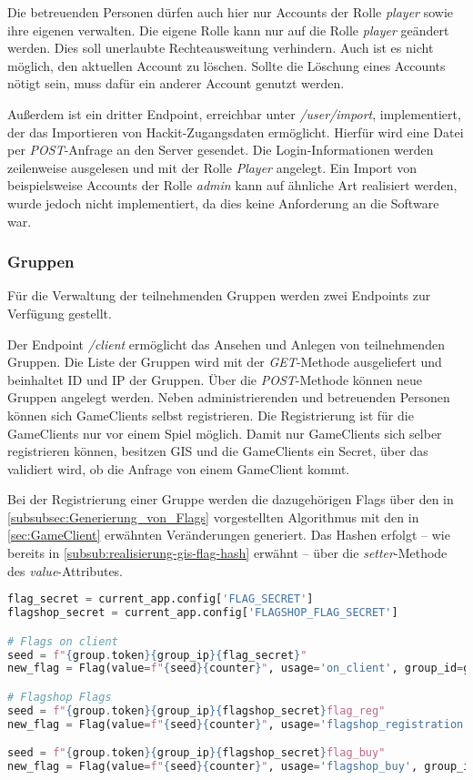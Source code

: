 Die betreuenden Personen dürfen auch hier nur Accounts der Rolle \textit{player} sowie ihre eigenen verwalten. Die eigene Rolle kann nur auf die Rolle \textit{player} geändert werden. Dies soll unerlaubte Rechteausweitung verhindern. Auch ist es nicht möglich, den aktuellen Account zu löschen. Sollte die Löschung eines Accounts nötigt sein, muss dafür ein anderer Account genutzt werden.

Außerdem ist ein dritter Endpoint, erreichbar unter \textit{/user/import}, implementiert, der das Importieren von Hackit-Zugangsdaten ermöglicht. Hierfür wird eine Datei per \textit{POST}-Anfrage an den Server gesendet. Die Login-Informationen werden zeilenweise ausgelesen und mit der Rolle \textit{Player} angelegt. Ein Import von beispielsweise Accounts der Rolle \textit{admin} kann auf ähnliche Art realisiert werden, wurde jedoch nicht implementiert, da dies keine Anforderung an die Software war.

\subsubsection{Gruppen}
Für die Verwaltung der teilnehmenden Gruppen werden zwei Endpoints zur Verfügung gestellt.

Der Endpoint \textit{/client} ermöglicht das Ansehen und Anlegen von teilnehmenden Gruppen.
Die Liste der Gruppen wird mit der \textit{GET}-Methode ausgeliefert und beinhaltet ID und IP der Gruppen. Über die \textit{POST}-Methode können neue Gruppen angelegt werden. Neben administrierenden und betreuenden Personen können sich GameClients selbst registrieren. Die Registrierung ist für die GameClients nur vor einem Spiel möglich. Damit nur GameClients sich selber registrieren können, besitzen GIS und die GameClients ein Secret, über das validiert wird, ob die Anfrage von einem GameClient kommt.

Bei der Registrierung einer Gruppe werden die dazugehörigen Flags über den in \autoref{subsubsec:Generierung_von_Flags} vorgestellten Algorithmus mit den in \autoref{sec:GameClient} erwähnten Veränderungen generiert. Das Hashen erfolgt -- wie bereits in \autoref{subsub:realisierung-gis-flag-hash} erwähnt -- über die \textit{setter}-Methode des \textit{value}-Attributes.

\begin{lstlisting}[language=Python, frame=single, caption={GIS Flaggenerierung}, captionpos=b, label={lst:gis-flag-gen}]
flag_secret = current_app.config['FLAG_SECRET']
flagshop_secret = current_app.config['FLAGSHOP_FLAG_SECRET']

# Flags on client
seed = f"{group.token}{group_ip}{flag_secret}"
new_flag = Flag(value=f"{seed}{counter}", usage='on_client', group_id=group.id)

# Flagshop Flags
seed = f"{group.token}{group_ip}{flagshop_secret}flag_reg"
new_flag = Flag(value=f"{seed}{counter}", usage='flagshop_registration', group_id=group.id)

seed = f"{group.token}{group_ip}{flagshop_secret}flag_buy"
new_flag = Flag(value=f"{seed}{counter}", usage='flagshop_buy', group_id=group.id)
\end{lstlisting}

